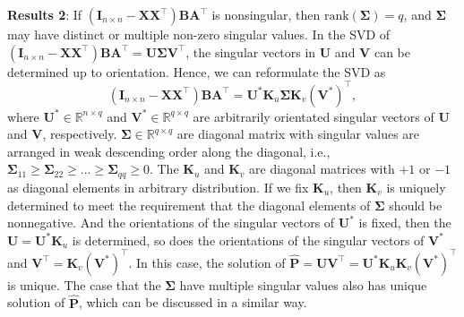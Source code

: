 \documentclass[titlepage,11pt,twoside]{article}
\begin{document}
\textbf{Results 2}: If $(\mathbf{I}_{n\times n}-\mathbf{X}\mathbf{X}^{\top})\mathbf{B}\mathbf{A}^{\top}$ is nonsingular, then $\text{rank}(\mathbf{\Sigma})=q$, and $\mathbf{\Sigma}$ may have distinct or multiple non-zero singular values. In the SVD of $(\mathbf{I}_{n\times n}-\mathbf{X}\mathbf{X}^{\top})\mathbf{B}\mathbf{A}^{\top}
=
\mathbf{U}\mathbf{\Sigma}\mathbf{V}^{\top}$, the singular vectors in $\mathbf{U}$ and $\mathbf{V}$
can be determined up to orientation. Hence, we can reformulate the SVD as 
\begin{equation}
(\mathbf{I}_{n\times n}-\mathbf{X}\mathbf{X}^{\top})\mathbf{B}\mathbf{A}^{\top}
=
\mathbf{U}^{*}\mathbf{K}_{u}\mathbf{\Sigma}\mathbf{K}_{v}(\mathbf{V}^{*})^{\top},
\end{equation}
where $\mathbf{U}^{*}\in \mathbb{R}^{n\times q}$ and $\mathbf{V}^{*}\in \mathbb{R}^{q\times q}$ are arbitrarily orientated singular vectors of $\mathbf{U}$ and $\mathbf{V}$, respectively. $\mathbf{\Sigma}\in \mathbb{R}^{q\times q}$ are diagonal matrix with singular values are arranged in weak descending order along the diagonal, i.e., $\mathbf{\Sigma}_{11}\ge\mathbf{\Sigma}_{22}\ge...\ge\mathbf{\Sigma}_{qq}\ge0$. The $\mathbf{K}_{u}$ and $\mathbf{K}_{v}$ are diagonal matrices with $+1$ or $-1$ as diagonal elements in arbitrary distribution. If we fix $\mathbf{K}_{u}$, then $\mathbf{K}_{v}$ is uniquely determined to meet the requirement that the diagonal elements of $\mathbf{\Sigma}$ should be nonnegative. And the orientations of the singular vectors of $\mathbf{U}^{*}$ is fixed, then the $\mathbf{U}=\mathbf{U}^{*}\mathbf{K}_{u}$ is determined, so does the orientations of the singular vectors of $\mathbf{V}^{*}$ and $\mathbf{V}^{\top}=\mathbf{K}_{v}(\mathbf{V}^{*})^{\top}$. In this case, the solution of $\mathbf{\hat{P}}=\mathbf{U}\mathbf{V}^{\top}=\mathbf{U}^{*}\mathbf{K}_{u}\mathbf{K}_{v}(\mathbf{V}^{*})^{\top}$ is unique. The case that the $\mathbf{\Sigma}$ have multiple singular values also has unique solution of $\mathbf{\hat{P}}$, which can be discussed in a similar way. 
\end{document}
